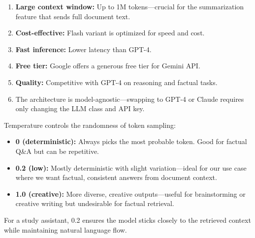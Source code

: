 \documentclass[12pt,a4paper]{article}
\begin{document}
\begin{interviewbox}
\end{interviewbox}
\begin{answerbox}
\begin{enumerate}
  \item \textbf{Large context window:} Up to 1M tokens—crucial for the summarization feature that sends full document text.
  \item \textbf{Cost-effective:} Flash variant is optimized for speed and cost.
  \item \textbf{Fast inference:} Lower latency than GPT-4.
  \item \textbf{Free tier:} Google offers a generous free tier for Gemini API.
  \item \textbf{Quality:} Competitive with GPT-4 on reasoning and factual tasks.
  \item The architecture is model-agnostic—swapping to GPT-4 or Claude requires only changing the LLM class and API key.
\end{enumerate}
\end{answerbox}

\begin{interviewbox}
\end{interviewbox}
\begin{answerbox}
Temperature controls the randomness of token sampling:
\begin{itemize}
  \item \textbf{0 (deterministic):} Always picks the most probable token. Good for factual Q\&A but can be repetitive.
  \item \textbf{0.2 (low):} Mostly deterministic with slight variation—ideal for our use case where we want factual, consistent answers from document context.
  \item \textbf{1.0 (creative):} More diverse, creative outputs—useful for brainstorming or creative writing but undesirable for factual retrieval.
\end{itemize}
For a study assistant, 0.2 ensures the model sticks closely to the retrieved context while maintaining natural language flow.
\end{answerbox}
\end{document}
